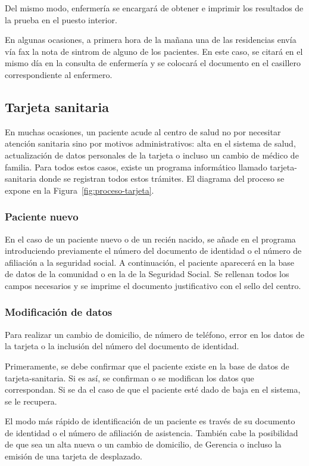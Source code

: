 Del mismo modo, enfermería se encargará de obtener e imprimir los resultados de la prueba en el puesto interior.

En algunas ocasiones, a primera hora de la mañana una de las residencias envía vía fax la nota de \Gls{sintrom} de alguno de los pacientes.
En este caso, se citará en el mismo día en la consulta de enfermería y se colocará el documento en el casillero correspondiente al enfermero.

\subsection{Tarjeta sanitaria}

En muchas ocasiones, un paciente acude al centro de salud no por necesitar atención sanitaria sino por motivos administrativos: alta en el sistema de salud, actualización de datos personales de la tarjeta o incluso un cambio de médico de familia. Para todos estos casos, existe un programa informático llamado \Gls{tarjeta-sanitaria} donde se registran todos estos trámites. El diagrama del proceso se expone en la Figura~\ref{fig:proceso-tarjeta}.

\subsubsection{Paciente nuevo}

En el caso de un paciente nuevo o de un recién nacido, se añade en el programa introduciendo previamente el número del documento de identidad o el número de afiliación a la seguridad social.
A continuación, el paciente aparecerá en la base de datos de la comunidad o en la de la Seguridad Social.
Se rellenan todos los campos necesarios y se imprime el documento justificativo con el sello del centro.

\subsubsection{Modificación de datos}

Para realizar un cambio de domicilio, de número de teléfono, error en los datos de la tarjeta o la inclusión del número del documento de identidad.

Primeramente, se debe confirmar que el paciente existe en la base de datos de \Gls{tarjeta-sanitaria}.
Si es así, se confirman o se modifican los datos que correspondan.
Si se da el caso de que el paciente esté dado de baja en el sistema, se le recupera.

El modo más rápido de identificación de un paciente es través de su documento de identidad o el número de afiliación de asistencia.
También cabe la posibilidad de que sea un alta nueva o un cambio de domicilio, de Gerencia o incluso la emisión de una tarjeta de desplazado.

